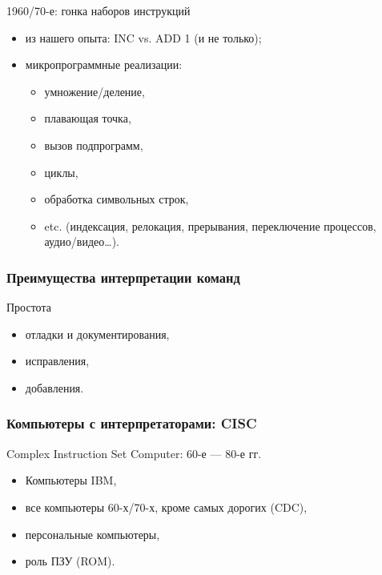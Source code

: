 \begin{frame}{1960/70-е: гонка наборов инструкций}
\begin{itemize}\itemsep=.4cm
\item из нашего опыта: INC vs. ADD 1 \pause(и не только);
\pause\item микропрограммные реализации:
    \begin{itemize}\itemsep=.2cm
    \item умножение/деление,
    \item плавающая точка,
    \item вызов подпрограмм,
    \item циклы,
    \item обработка символьных строк,
    \item etc. (индексация, релокация, прерывания, переключение процессов, аудио/видео…).
    \end{itemize}
\end{itemize}
\end{frame}

\begin{frame}
\frametitle{Преимущества интерпретации команд}
\begin{block}{Простота}\pause
\begin{itemize}\itemsep=.4cm
    \item отладки и документирования,
    \item исправления,
    \item добавления.
\end{itemize}
\end{block}
\end{frame}

\begin{frame}
\frametitle{Компьютеры с интерпретаторами: CISC}

\begin{block}{\alert{Complex} Instruction Set Computer: 60-е — 80-е гг.}
\begin{itemize}\itemsep=.4cm
    \item Компьютеры IBM,
    \item все компьютеры 60-х/70-х, кроме самых дорогих (CDC),
    \item персональные компьютеры,
    \item роль ПЗУ (ROM).
\end{itemize}
\end{block}
\end{frame}

